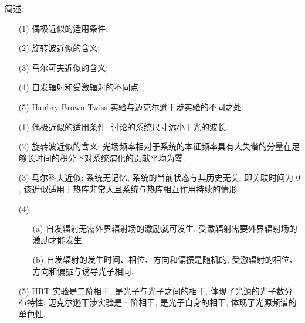 \documentclass{assignment}
\begin{document}
\begin{prob}
    简述:
    \begin{itemize}
        \item[(1)] 偶极近似的适用条件;
        \item[(2)] 旋转波近似的含义;
        \item[(3)] 马尔可夫近似的含义;
        \item[(4)] 自发辐射和受激辐射的不同点;
        \item[(5)] Hanbry-Brown-Twiss 实验与迈克尔逊干涉实验的不同之处.
    \end{itemize}
\end{prob}
\begin{sol}
    \begin{itemize}
        \item[(1)] 偶极近似的适用条件: 讨论的系统尺寸远小于光的波长.
        \item[(2)] 旋转波近似的含义: 光场频率相对于系统的本征频率具有大失谐的分量在足够长时间的积分下对系统演化的贡献平均为零.
        \item[(3)] 马尔科夫近似: 系统无记忆, 系统的当前状态与其历史无关, 即关联时间为 $0$, 该近似适用于热库非常大且系统与热库相互作用持续的情形.
        \item[(4)] 
        \begin{itemize}
            \item[(a)] 自发辐射无需外界辐射场的激励就可发生, 受激辐射需要外界辐射场的激励才能发生;
            \item[(b)] 自发辐射的发生时间、相位、方向和偏振是随机的, 受激辐射的相位、方向和偏振与诱导光子相同.
        \end{itemize}
        \item[(5)] HBT 实验是二阶相干, 是光子与光子之间的相干, 体现了光源的光子数分布特性; 迈克尔逊干涉实验是一阶相干, 是光子自身的相干, 体现了光源频谱的单色性.
    \end{itemize}
\end{sol}
\end{document}
